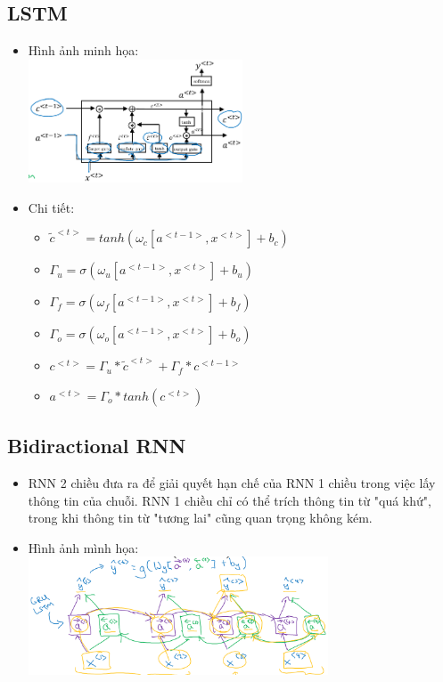 \documentclass[12pt,a4paper]{report}
\begin{document}
		\subsection{LSTM}
			\begin{itemize}
				\item Hình ảnh minh họa:\\\includegraphics[width=0.5\textwidth]{LSTM}
				\item Chi tiết:
					\begin{itemize}
						\item $\tilde{c}^{<t>}=tanh(\omega_c[a^{<t-1>},x^{<t>}]+b_c)$
						\item $\Gamma_u = \sigma(\omega_u[a^{<t-1>},x^{<t>}]+b_u)$
						\item $\Gamma_f = \sigma(\omega_f[a^{<t-1>},x^{<t>}]+b_f)$
						\item $\Gamma_o = \sigma(\omega_o[a^{<t-1>},x^{<t>}]+b_o)$
						\item $c^{<t>}=\Gamma_u*\tilde{c}^{<t>} + \Gamma_f * c^{<t-1>}$
						\item $a^{<t>} = \Gamma_o * tanh(c^{<t>})$
					\end{itemize}
			\end{itemize}
		\subsection{Bidiractional RNN}
			\begin{itemize}
				\item RNN 2 chiều đưa ra để giải quyết hạn chế của RNN 1 chiều trong việc lấy thông tin của chuỗi. RNN 1 chiều chỉ có thể trích thông tin từ "quá khứ", trong khi thông tin từ "tương lai" cũng quan trọng không kém.
				\item Hình ảnh mình họa:\\\includegraphics[width=0.7\textwidth]{BiRNN}
			\end{itemize}
\end{document}
